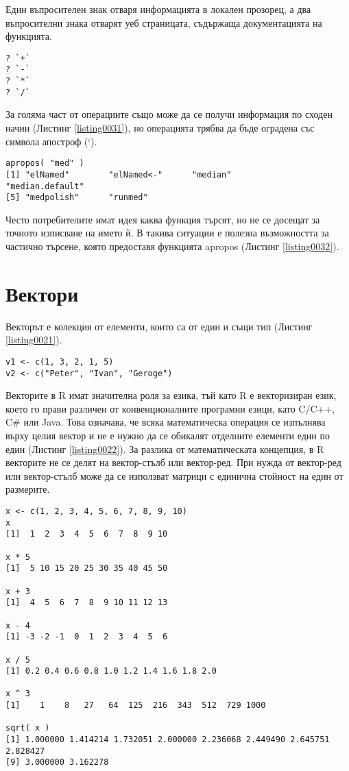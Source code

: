 Един въпросителен знак отваря информацията в локален прозорец, а два въпросителни знака отварят уеб страницата, съдържаща документацията на функцията.

\begin{lstlisting}[caption=Документация за операции, label=listing0031]
? `+`
? `-`
? `*`
? `/`
\end{lstlisting}

За голяма част от операциите също може да се получи информация по сходен начин (Листинг \ref{listing0031}), но операцията трябва да бъде оградена със символа апостроф (`).

\begin{lstlisting}[caption=Частично търсене, label=listing0032]
apropos( "med" )
[1] "elNamed"        "elNamed<-"      "median"         "median.default"
[5] "medpolish"      "runmed"
\end{lstlisting}

Често потребителите имат идея каква функция търсят, но не се досещат за точното изписване на името ѝ. В такива ситуации е полезна възможността за частично търсене, която предоставя функцията apropos (Листинг \ref{listing0032}).

\section{Вектори}

Векторът е колекция от елементи, които са от един и същи тип (Листинг \ref{listing0021}). 

\begin{lstlisting}[caption=Вектор от числа и вектор от символни низове, label=listing0021]
v1 <- c(1, 3, 2, 1, 5)
v2 <- c("Peter", "Ivan", "Geroge")
\end{lstlisting}

Векторите в R имат значителна роля за езика, тъй като R е векторизиран език, което го прави различен от конвенционалните програмни езици, като C/C++, C\# или Java. Това означава, че всяка математическа операция се изпълнява върху целия вектор и не е нужно да се обикалят отделните елементи един по един (Листинг \ref{listing0022}). За разлика от математическата концепция, в R векторите не се делят на вектор-стълб или вектор-ред. При нужда от вектор-ред или вектор-стълб може да се използват матрици с единична стойност на един от размерите.

\begin{lstlisting}[caption=Базови операции над вектори, label=listing0022]
x <- c(1, 2, 3, 4, 5, 6, 7, 8, 9, 10)
x
[1]  1  2  3  4  5  6  7  8  9 10

x * 5
[1]  5 10 15 20 25 30 35 40 45 50

x + 3
[1]  4  5  6  7  8  9 10 11 12 13

x - 4
[1] -3 -2 -1  0  1  2  3  4  5  6

x / 5
[1] 0.2 0.4 0.6 0.8 1.0 1.2 1.4 1.6 1.8 2.0

x ^ 3
[1]    1    8   27   64  125  216  343  512  729 1000

sqrt( x )
[1] 1.000000 1.414214 1.732051 2.000000 2.236068 2.449490 2.645751 2.828427
[9] 3.000000 3.162278
\end{lstlisting}

